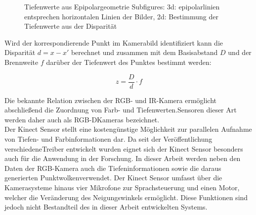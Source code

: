 \begin{figure}[ht]
	\begin{center}
		\caption{Tiefenwerte aus Epipolargeometrie Subfigures: 3d: epipolarlinien entsprechen horizontalen Linien der Bilder, 2d: Bestimmung der Tiefenwerte aus der Disparität}
		\label{fig.kinect_depth}
	\end{center}
\end{figure}


Wird der korrespondierende Punkt im Kamerabild identifiziert kann die Disparität $d = x - x'$ berechnet und zusammen mit dem Basisabstand $D$ und der Brennweite $f$ darüber der Tiefenwert des Punktes bestimmt werden:

\begin{equation}
z = \frac{D}{d}\cdot f
\end{equation}

Die bekannte Relation zwischen der RGB- und IR-Kamera ermöglicht abschließend die Zuordnung von Farb- und Tiefenwerten. Sensoren dieser Art werden daher auch als RGB-D\red[footnote] Kameras bezeichnet.\\

Der Kinect Sensor stellt eine kostengünstige Möglichkeit zur parallelen Aufnahme von Tiefen- und Farbinformationen dar. Da seit der Veröffentlichung verschiedene Treiber entwickelt wurden eignet sich der Kinect Sensor besonders auch für die Anwendung in der Forschung. In dieser Arbeit werden neben den Daten der RGB-Kamera auch die Tiefeninformationen sowie die daraus generierten Punktwolken\red[footnote?] verwendet. Der Kinect Sensor umfasst über die Kamerasysteme hinaus vier Mikrofone zur Sprachsteuerung und einen Motor, welcher die Veränderung des Neigungswinkels ermöglicht. Diese Funktionen sind jedoch nicht Bestandteil des in dieser Arbeit entwickelten Systems.\\


\\


